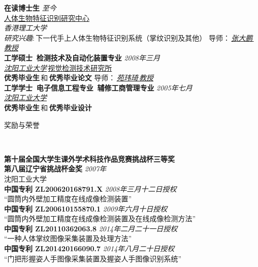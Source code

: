 \documentclass{article}
\newenvironment{changemargin}[2]{%
  \begin{list}{}{%
    \setlength{\topsep}{0pt}%
    \setlength{\leftmargin}{#1}%
    \setlength{\rightmargin}{#2}%
    \setlength{\listparindent}{\parindent}%
    \setlength{\itemindent}{\parindent}%
    \setlength{\parsep}{\parskip}%
  }%
  \item[]}{\end{list}
}
\newcommand{\lineover}{
	\begin{changemargin}{-0.05in}{-0.05in}
		\vspace*{-8pt}
		\hrulefill \\
		\vspace*{-2pt}
	\end{changemargin}
}
\newcommand{\header}[1]{
	\begin{changemargin}{-0.5in}{-0.5in}
		\scshape{#1}\\
  	\lineover
	\end{changemargin}
}
\newenvironment{body} {
	\vspace*{-16pt}
	\begin{changemargin}{-0.25in}{-0.5in}
  }	
	{\end{changemargin}
}
\begin{document}
\begin{body}
	\vspace{14pt}
	\textbf{在读博士生}{} \hfill \emph{至今}{} \\
    \href{http://www.comp.polyu.edu.hk/~biometrics/}{人体生物特征识别研究中心}\\    
	\emph{香港理工大学}\\  
    \emph{研究兴趣}:\,下一代手上人体生物特征识别系统（掌纹识别及其他）
    \hfill 导师：\,\emph{\href{http://www4.comp.polyu.edu.hk/~csdzhang/}{张大鹏\,教授}}\\
  \medskip
	\textbf{工学硕士\, 检测技术及自动化装置专业}{} \hfill \emph{2008年三月}{} \\
	\emph{\href{http://www.sut.edu.cn/}{沈阳工业大学}}\,\href{http://www.syias.org.cn/}{视觉检测技术研究所}\\
	\textbf{优秀毕业生}\,和\,\textbf{优秀毕业论文}
    \hfill 导师：\,\emph{\href{http://xxxy.sut.edu.cn/index.jsp?id=551&srcname=xyld}{苑玮琦\,教授}}\\
  \medskip
	\textbf{工学学士\, 电子信息工程专业\, 辅修工商管理专业} \hfill \emph{2005年七月} \\
    \emph{\href{http://www.sut.edu.cn/}{沈阳工业大学}}\\
    \textbf{优秀毕业生}\,和\,\textbf{优秀毕业设计}\\
\end{body}

\medskip


\header{奖励与荣誉}

\begin{body}
	\vspace{14pt}	
    \textbf{第十届全国大学生课外学术科技作品竞赛挑战杯三等奖\\
    第八届辽宁省挑战杯金奖}
    \hfill{} \emph{2007年}\\
    沈阳工业大学\\
    \medskip
    \textbf{中国专利 ZL200620168791.X}
    \hfill{} \emph{2008年三月十二日授权}\\
    ``圆筒内外壁加工精度在线成像检测装置''\\
    \medskip
    \textbf{中国专利 ZL200610155870.1}
    \hfill{} \emph{2009年六月十日授权}\\
    ``圆筒内外壁加工精度在线成像检测装置及在线成像检测方法''\\
    \medskip    
    \textbf{中国专利 ZL20110362063.8}
    \hfill{} \emph{2014年二月二十一日授权}\\
    ``一种人体掌纹图像采集装置及处理方法'' \\
    \medskip    
    \textbf{中国专利 ZL201420166090.7}
    \hfill{} \emph{2014年八月二十日授权}\\
    ``门把形握姿人手图像采集装置及握姿人手图像识别系统'' 
\end{body}
\end{document}
